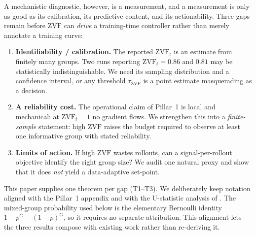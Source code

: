 \documentclass[11pt]{article}
\theoremstyle{plain}
\theoremstyle{definition}
\theoremstyle{remark}
\newcommand{\ZVF}{\ensuremath{\mathrm{ZVF}}}
\newcommand{\1}{\mathbb{1}}
\begin{document}
A mechanistic diagnostic, however, is a measurement, and a measurement is only
as good as its calibration, its predictive content, and its actionability.
Three gaps remain before \ZVF{} can \emph{drive} a training-time controller
rather than merely annotate a training curve:

\begin{enumerate}[leftmargin=1.5em,itemsep=2pt]
  \item \textbf{Identifiability / calibration.} The reported $\ZVF_t$ is an
        estimate from finitely many groups. Two runs reporting
        $\ZVF_t = 0.86$ and $0.81$ may be statistically indistinguishable. We
        need its sampling distribution and a confidence interval, or any
        threshold $\tau_{\ZVF}$ is a point estimate masquerading as a decision.
  \item \textbf{A reliability cost.} The operational claim of Pillar~1 is local
        and mechanical: at $\ZVF_t = 1$ no gradient flows. We strengthen this
        into a \emph{finite-sample} statement: high \ZVF{} raises the budget
        required to observe at least one informative group with stated reliability.
  \item \textbf{Limits of action.} If high \ZVF{} wastes rollouts, can a
        signal-per-rollout objective identify the right group size? We audit one
        natural proxy and show that it does \emph{not} yield a data-adaptive
        set-point.
\end{enumerate}

This paper supplies one theorem per gap (T1--T3). We deliberately keep
notation aligned with the Pillar~1 appendix and with the U-statistic analysis
of \citet{zhou2026demystifyinggrpo}. The mixed-group probability used below is
the elementary Bernoulli identity $1-p^G-(1-p)^G$, so it requires no separate
attribution. This alignment lets the three results compose with existing work
rather than re-deriving it.
\end{document}
